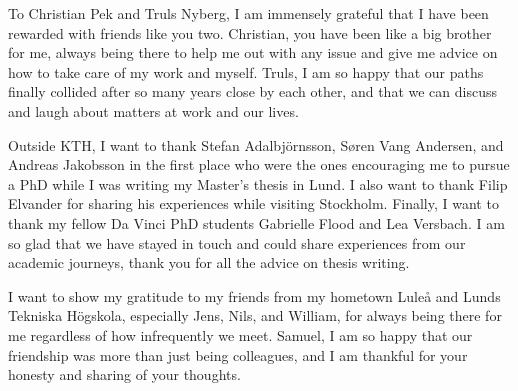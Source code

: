 


\noindent To Christian Pek and Truls Nyberg, I am immensely grateful that I have been rewarded with friends like you two. Christian, you have been like a big brother for me, always being there to help me out with any issue and give me advice on how to take care of my work and myself. Truls, I am so happy that our paths finally collided after so many years close by each other, and that we can discuss and laugh about matters at work and our lives. 
\newline 

\noindent Outside KTH, I want to thank Stefan Adalbjörnsson, S{\o}ren Vang Andersen, and Andreas Jakobsson in the first place who were the ones encouraging me to pursue a PhD while I was writing my Master's thesis in Lund. I also want to thank Filip Elvander for sharing his experiences while visiting Stockholm. 
Finally, I want to thank my fellow Da Vinci PhD students Gabrielle Flood and Lea Versbach. I am so glad that we have stayed in touch and could share experiences from our academic journeys, thank you for all the advice on thesis writing. 
\newline 


\noindent I want to show my gratitude to my friends from my hometown Luleå and Lunds Tekniska Högskola, especially Jens, Nils, and William, for always being there for me regardless of how infrequently we meet. Samuel, I am so happy that our friendship was more than just being colleagues, and I am thankful for your honesty and sharing of your thoughts.   
\newline    


